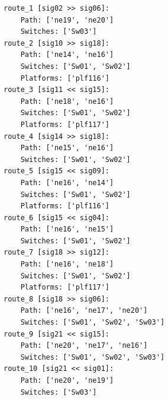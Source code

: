 \begin{lstlisting}[language = {}, caption = Routes.RNA, label = {lst:EJ2_7}]
route_1 [sig02 >> sig06]:
	Path: ['ne19', 'ne20']
	Switches: ['Sw03']
route_2 [sig10 >> sig18]:
	Path: ['ne14', 'ne16']
	Switches: ['Sw01', 'Sw02']
	Platforms: ['plf116']
route_3 [sig11 << sig15]:
	Path: ['ne18', 'ne16']
	Switches: ['Sw01', 'Sw02']
	Platforms: ['plf117']
route_4 [sig14 >> sig18]:
	Path: ['ne15', 'ne16']
	Switches: ['Sw01', 'Sw02']
route_5 [sig15 << sig09]:
	Path: ['ne16', 'ne14']
	Switches: ['Sw01', 'Sw02']
	Platforms: ['plf116']
route_6 [sig15 << sig04]:
	Path: ['ne16', 'ne15']
	Switches: ['Sw01', 'Sw02']
route_7 [sig18 >> sig12]:
	Path: ['ne16', 'ne18']
	Switches: ['Sw01', 'Sw02']
	Platforms: ['plf117']
route_8 [sig18 >> sig06]:
	Path: ['ne16', 'ne17', 'ne20']
	Switches: ['Sw01', 'Sw02', 'Sw03']
route_9 [sig21 << sig15]:
	Path: ['ne20', 'ne17', 'ne16']
	Switches: ['Sw01', 'Sw02', 'Sw03']
route_10 [sig21 << sig01]:
	Path: ['ne20', 'ne19']
	Switches: ['Sw03']
\end{lstlisting}